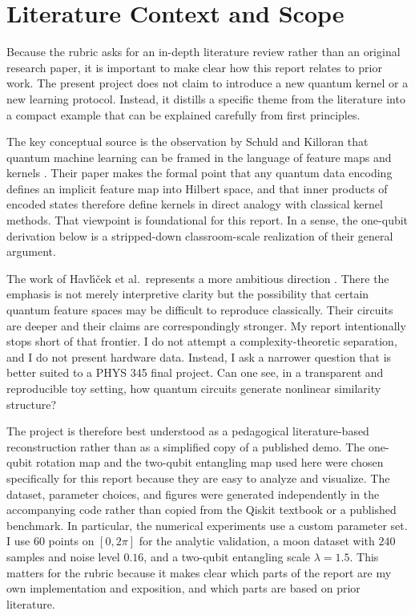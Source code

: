 \documentclass[11pt]{article}
\begin{document}
\section{Literature Context and Scope}

Because the rubric asks for an in-depth literature review rather than an original research paper, it is important to make clear how this report relates to prior work. The present project does not claim to introduce a new quantum kernel or a new learning protocol. Instead, it distills a specific theme from the literature into a compact example that can be explained carefully from first principles.

The key conceptual source is the observation by Schuld and Killoran that quantum machine learning can be framed in the language of feature maps and kernels \cite{schuld2019feature}. Their paper makes the formal point that any quantum data encoding defines an implicit feature map into Hilbert space, and that inner products of encoded states therefore define kernels in direct analogy with classical kernel methods. That viewpoint is foundational for this report. In a sense, the one-qubit derivation below is a stripped-down classroom-scale realization of their general argument.

The work of Havl\'{\i}\v{c}ek et al.\ represents a more ambitious direction \cite{havlicek2019feature}. There the emphasis is not merely interpretive clarity but the possibility that certain quantum feature spaces may be difficult to reproduce classically. Their circuits are deeper and their claims are correspondingly stronger. My report intentionally stops short of that frontier. I do not attempt a complexity-theoretic separation, and I do not present hardware data. Instead, I ask a narrower question that is better suited to a PHYS 345 final project. Can one see, in a transparent and reproducible toy setting, how quantum circuits generate nonlinear similarity structure?

The project is therefore best understood as a pedagogical literature-based reconstruction rather than as a simplified copy of a published demo. The one-qubit rotation map and the two-qubit entangling map used here were chosen specifically for this report because they are easy to analyze and visualize. The dataset, parameter choices, and figures were generated independently in the accompanying code rather than copied from the Qiskit textbook or a published benchmark. In particular, the numerical experiments use a custom parameter set. I use $60$ points on $[0,2\pi]$ for the analytic validation, a moon dataset with $240$ samples and noise level $0.16$, and a two-qubit entangling scale $\lambda=1.5$. This matters for the rubric because it makes clear which parts of the report are my own implementation and exposition, and which parts are based on prior literature.
\end{document}
